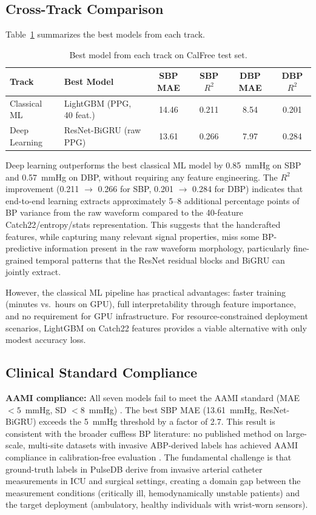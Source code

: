 \documentclass[11pt]{article}
\begin{document}
\subsection{Cross-Track Comparison}

Table~\ref{tab:cross_track} summarizes the best models from each track.

\begin{table}[ht!]
\centering
\begin{tabular}{@{}llcccc@{}}
\toprule
\textbf{Track} & \textbf{Best Model} & \textbf{SBP MAE} & \textbf{SBP $R^2$} & \textbf{DBP MAE} & \textbf{DBP $R^2$} \\
\midrule
Classical ML & LightGBM (PPG, 40 feat.) & 14.46 & 0.211 & 8.54 & 0.201 \\
Deep Learning & ResNet-BiGRU (raw PPG) & 13.61 & 0.266 & 7.97 & 0.284 \\
\bottomrule
\end{tabular}
\caption{Best model from each track on CalFree test set.}
\label{tab:cross_track}
\end{table}

Deep learning outperforms the best classical ML model by 0.85~mmHg on SBP and 0.57~mmHg on DBP, without requiring any feature engineering. The $R^2$ improvement (0.211 $\to$ 0.266 for SBP, 0.201 $\to$ 0.284 for DBP) indicates that end-to-end learning extracts approximately 5--8 additional percentage points of BP variance from the raw waveform compared to the 40-feature Catch22/entropy/stats representation. This suggests that the handcrafted features, while capturing many relevant signal properties, miss some BP-predictive information present in the raw waveform morphology, particularly fine-grained temporal patterns that the ResNet residual blocks and BiGRU can jointly extract.

However, the classical ML pipeline has practical advantages: faster training (minutes vs.\ hours on GPU), full interpretability through feature importance, and no requirement for GPU infrastructure. For resource-constrained deployment scenarios, LightGBM on Catch22 features provides a viable alternative with only modest accuracy loss.

\subsection{Clinical Standard Compliance}

\textbf{AAMI compliance:} All seven models fail to meet the AAMI standard (MAE $< 5$~mmHg, SD $< 8$~mmHg) \citep{aami2003sp10}. The best SBP MAE (13.61~mmHg, ResNet-BiGRU) exceeds the 5~mmHg threshold by a factor of 2.7. This result is consistent with the broader cuffless BP literature: no published method on large-scale, multi-site datasets with invasive ABP-derived labels has achieved AAMI compliance in calibration-free evaluation \citep{moulaeifard2025pulsedb}. The fundamental challenge is that ground-truth labels in PulseDB derive from invasive arterial catheter measurements in ICU and surgical settings, creating a domain gap between the measurement conditions (critically ill, hemodynamically unstable patients) and the target deployment (ambulatory, healthy individuals with wrist-worn sensors).
\end{document}
